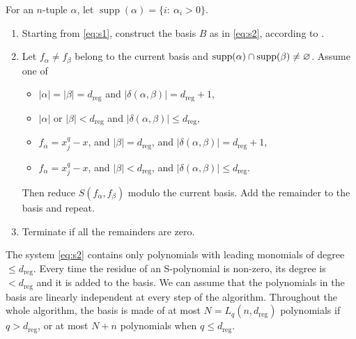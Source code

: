 \documentclass[a4paper, 12pt, oneside, openright]{article}
\begin{document}
For an $n$-tuple $\alpha$, let $\operatorname{supp}(\alpha)=\{i:\ \alpha_i>0\}$.
\begin{enumerate}
\item Starting from \eqref{eq:s1}, construct the basis $B$ as in \eqref{eq:s2}, according to \cite{ST}.
\item  Let $f_\alpha\ne f_\beta$ belong to the current  basis and $\hbox{supp}(\alpha)\cap \hbox{supp}(\beta)\ne\varnothing$. Assume one of 
\begin{itemize}
    \item  $|\alpha|=|\beta|=d_{\mathrm{reg}}$ and $|\delta(\alpha,\beta)|=d_{\mathrm{reg}}+1$,
    \item $|\alpha|$ or $|\beta|<d_{\mathrm{reg}}$ and $|\delta(\alpha,\beta)|\leq d_{\mathrm{reg}}$,
    \item $f_{\alpha}=x_j^q-x$, and $|\beta|=d_{\mathrm{reg}}$, and $|\delta(\alpha,\beta)|=d_{\mathrm{reg}}+1$,
    \item $f_{\alpha}=x_j^q-x$, and $|\beta|<d_{\mathrm{reg}}$, and $|\delta(\alpha,\beta)|\leq d_{\mathrm{reg}}$.  
\end{itemize}
Then reduce $S(f_\alpha,f_\beta)$  modulo the current basis. Add the remainder to the basis and repeat.
\item Terminate if all the remainders are zero.
\end{enumerate}
The system  \eqref{eq:s2} contains only polynomials with leading monomials of degree $\le d_{\mathrm{reg}}$.  Every time the residue of an S-polynomial is non-zero, its degree is $<d_{\mathrm{reg}}$ and it is added to the basis. We can assume that the polynomials in the basis are linearly independent at every step of the algorithm.
Throughout the whole algorithm, the basis is made of at most $N=L_q(n,d_{\mathrm{reg}})$ polynomials if $q > d_{\mathrm{reg}}$, or  at most $N + n$ polynomials when $q \le d_{\mathrm{reg}}$.
\end{document}
